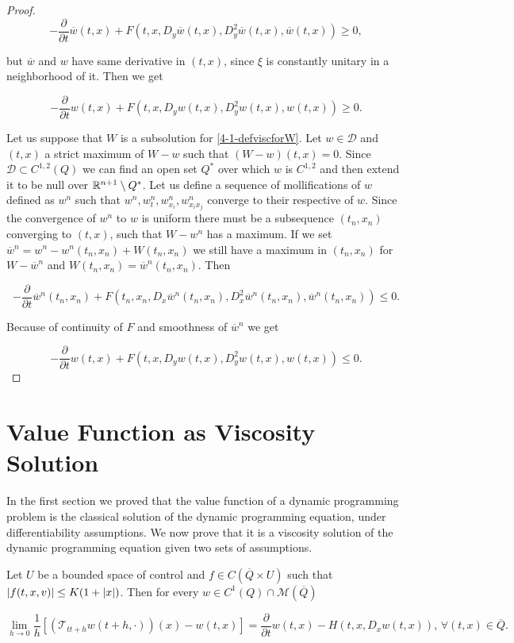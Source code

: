 \begin{theorem}
\begin{proof}
        \[-\frac{\partial}{\partial t}\overline{w}(t,x) + F(t,x,D_y\overline{w}(t,x),D_y^2\overline{w}(t,x),\overline{w}(t,x))\geq0,\]

        but $\overline{w}$ and $w$ have same derivative in $(t,x)$, since $\xi$ is constantly unitary in a neighborhood of it. Then we get

        \[-\frac{\partial}{\partial t}w(t,x) + F(t,x,D_yw(t,x),D_y^2w(t,x),w(t,x))\geq0.\]

        Let us suppose that $W$ is a subsolution for \ref{4-1-defviscforW}. Let $w\in\mathcal{D}$ and $(t,x)$ a strict maximum of $W-w$ such that $(W-w)(t,x)=0$. 
        Since $\mathcal{D}\subset C^{1,2}(Q)$ we can find an open set $Q^{\ast}$ over which $w$ is $C^{1,2}$ and then extend it to be null over $\mathbb{R}^{n+1}\setminus Q^{\ast}$. 
        Let us define a sequence of mollifications of $w$ defined as $w^n$ such that $w^n,w_t^n,w_{x_i}^n,w_{x_ix_j}^n$ converge to their respective of $w$. 
        Since the convergence of $w^n$ to $w$ is uniform there must be a subsequence $(t_n,x_n)$ converging to $(t,x)$, such that $W-w^n$ has a maximum. If we set 
        $\overline{w}^n=w^n-w^n(t_n,x_n)+W(t_n,x_n)$ we still have a maximum in $(t_n,x_n)$ for $W-\overline{w}^n$ and $W(t_n,x_n)=\overline{w}^n(t_n,x_n)$. Then 

        \[-\frac{\partial}{\partial t}\overline{w}^n(t_n,x_n) + F(t_n,x_n,D_x\overline{w}^n(t_n,x_n), D_x^2\overline{w}^n(t_n,x_n), \overline{w}^n(t_n,x_n))\leq0.\]

        Because of continuity of $F$ and smoothness of $\overline{w}^n$ we get
        
        \[-\frac{\partial}{\partial t}w(t,x) + F(t,x,D_yw(t,x),D_y^2w(t,x),w(t,x))\leq0.\]
    \end{proof}
\end{theorem}

\section{Value Function as Viscosity Solution}

In the first section we proved that the value function of a dynamic programming problem is the classical solution of the dynamic programming equation, under differentiability 
assumptions. We now prove that it is a viscosity solution of the dynamic programming equation given two sets of assumptions.

\begin{theorem}\label{4-1-viscodynamiceq}
    Let $U$ be a bounded space of control and $f\in C(\overline{Q}\times U)$ such that $\abs{f(t,x,v)}\leq K(1+\abs{x})$. Then for every $w\in C^1(Q)\cap \mathcal{M}(\overline{Q})$ 

    \begin{equation}\label{4-1-viscodynamiceq-lim}
        \lim_{h\to 0} \frac{1}{h}\left[(\mathcal{T}_{tt+h}w(t+h,\cdot))(x)-w(t,x)\right] = \frac{\partial}{\partial t}w(t,x) - H(t,x,D_xw(t,x)), \,\forall(t,x)\in\overline{Q}.
    \end{equation}
\end{theorem}

